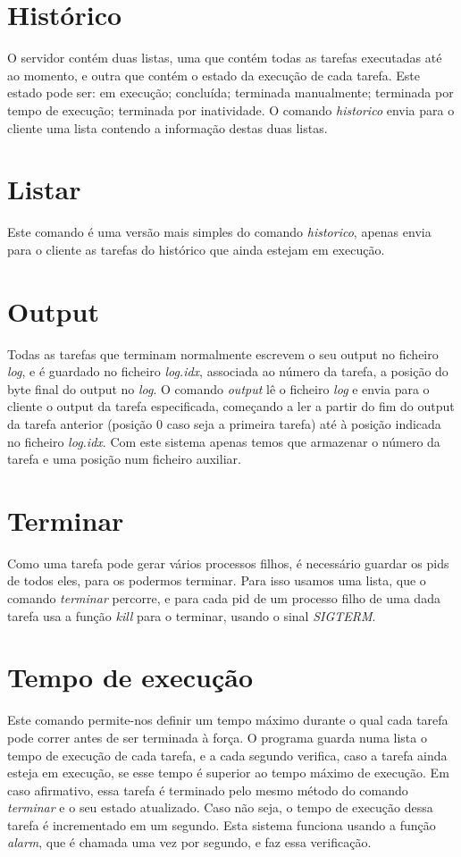 \documentclass[a4paper]{report}
\begin{document}
	\section{Histórico}
	O servidor contém duas listas, uma que contém todas as tarefas executadas até ao momento, e outra que contém o estado da execução de cada tarefa. Este estado pode ser: em execução; concluída; terminada manualmente; terminada por tempo de execução; terminada por inatividade. O comando \emph{historico} envia para o cliente uma lista contendo a informação destas duas listas.
	
	\section{Listar}
	Este comando é uma versão mais simples do comando \emph{historico}, apenas envia para o cliente as tarefas do histórico que ainda estejam em execução.
	
	\section{Output}
	Todas as tarefas que terminam normalmente escrevem o seu output no ficheiro \emph{log}, e é guardado no ficheiro \emph{log.idx}, associada ao número da tarefa, a posição do byte final do output no \emph{log}. O comando \emph{output} lê o ficheiro \emph{log} e envia para o cliente o output da tarefa especificada, começando a ler a partir do fim do output da tarefa anterior (posição 0 caso seja a primeira tarefa) até à posição indicada no ficheiro \emph{log.idx}. Com este sistema apenas temos que armazenar o número da tarefa e uma posição num ficheiro auxiliar.
	
	\section{Terminar}
	Como uma tarefa pode gerar vários processos filhos, é necessário guardar os pids de todos eles, para os podermos terminar. Para isso usamos uma lista, que o comando \emph{terminar} percorre, e para cada pid de um processo filho de uma dada tarefa usa a função \emph{kill} para o terminar, usando o sinal \emph{SIGTERM}.
	
	\section{Tempo de execução}
	Este comando permite-nos definir um tempo máximo durante o qual cada tarefa pode correr antes de ser terminada à força. O programa guarda numa lista o tempo de execução de cada tarefa, e a cada segundo verifica, caso a tarefa ainda esteja em execução, se esse tempo é superior ao tempo máximo de execução. Em caso afirmativo, essa tarefa é terminado pelo mesmo método do comando \emph{terminar} e o seu estado atualizado. Caso não seja, o tempo de execução dessa tarefa é incrementado em um segundo. Esta sistema funciona usando a função \emph{alarm}, que é chamada uma vez por segundo, e faz essa verificação.
	
\end{document}
